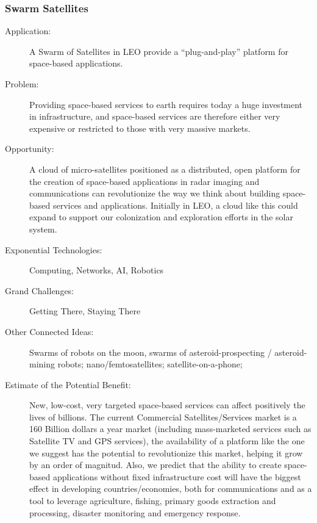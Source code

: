 \subsubsection{Swarm  Satellites}
 \begin{description}  \item[Application:] A Swarm of Satellites in \gls{LEO} provide a  ``plug-and-play'' platform for space-based applications.
 
  \item[Problem:] Providing  space-based services to earth requires today a huge investment in  infrastructure, and space-based services are therefore either very  expensive or restricted to those with very massive markets.
 
  \item[Opportunity:] A cloud of  micro-satellites positioned as a distributed, open platform for the  creation of space-based applications in radar imaging and communications can revolutionize the way we think about building space-based services  and applications. Initially in \gls{LEO}, a cloud like this could expand to  support our colonization and exploration efforts in the solar system.
 
  \item[Exponential Technologies:]  Computing, Networks, AI, Robotics
 
  \item[Grand Challenges:] Getting  There, Staying There
 
  \item[Other Connected Ideas:]  Swarms of robots on the moon, swarms of asteroid-prospecting /  asteroid-mining robots; nano/femtosatellites; satellite-on-a-phone;
 
  \item[Estimate of the Potential  Benefit:]New, low-cost, very targeted space-based services can affect  positively the lives of billions. The current Commercial  Satellites/Services market is a 160 Billion dollars a year market  (including mass-marketed services such as Satellite TV and GPS  services), the availability of a platform like the one we suggest has  the potential to revolutionize this market, helping it grow by an order  of magnitud. Also, we predict that the ability to create space-based  applications without fixed infrastructure cost will have the biggest  effect in developing countries/economies, both for communications and as  a tool to leverage agriculture, fishing, primary goods extraction and  processing, disaster monitoring and emergency response.
 

\end{description}

